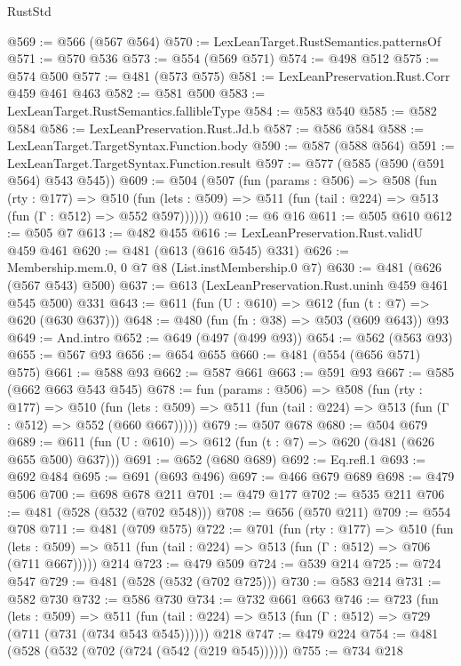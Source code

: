 \begin{lexlean}{RustStd}
\begin{coremodule}
{\begin{coremodule}
{{{{{{{@569 := @566 (@567 @564)
@570 := LexLeanTarget.RustSemantics.patternsOf
@571 := @570 @536
@573 := @554 (@569 @571)
@574 := @498 @512
@575 := @574 @500
@577 := @481 (@573 @575)
@581 := LexLeanPreservation.Rust.Corr @459 @461 @463
@582 := @581 @500
@583 := LexLeanTarget.RustSemantics.fallibleType
@584 := @583 @540
@585 := @582 @584
@586 := LexLeanPreservation.Rust.Jd.b
@587 := @586 @584
@588 := LexLeanTarget.TargetSyntax.Function.body
@590 := @587 (@588 @564)
@591 := LexLeanTarget.TargetSyntax.Function.result
@597 := @577 (@585 (@590 (@591 @564) @543 @545))
@609 := @504
    (@507
      (fun (params : @506) =>
      @508
        (fun (rty : @177) =>
        @510
          (fun (lets : @509) => @511 (fun (tail : @224) => @513 (fun (Γ : @512) => @552 @597))))))
@610 := @6 @16
@611 := @505 @610
@612 := @505 @7
@613 := @482 @455
@616 := LexLeanPreservation.Rust.validU @459 @461
@620 := @481 (@613 (@616 @545) @331)
@626 := Membership.mem.{0, 0} @7 @8 (List.instMembership.{0} @7)
@630 := @481 (@626 (@567 @543) @500)
@637 := @613 (LexLeanPreservation.Rust.uninh @459 @461 @545 @500) @331
@643 := @611 (fun (U : @610) => @612 (fun (t : @7) => @620 (@630 @637)))
@648 := @480 (fun (fn : @38) => @503 (@609 @643)) @93
@649 := And.intro
@652 := @649 (@497 (@499 @93))
@654 := @562 (@563 @93)
@655 := @567 @93
@656 := @654 @655
@660 := @481 (@554 (@656 @571) @575)
@661 := @588 @93
@662 := @587 @661
@663 := @591 @93
@667 := @585 (@662 @663 @543 @545)
@678 := fun (params : @506) =>
  @508
    (fun (rty : @177) =>
    @510
      (fun (lets : @509) => @511 (fun (tail : @224) => @513 (fun (Γ : @512) => @552 (@660 @667)))))
@679 := @507 @678
@680 := @504 @679
@689 := @611 (fun (U : @610) => @612 (fun (t : @7) => @620 (@481 (@626 @655 @500) @637)))
@691 := @652 (@680 @689)
@692 := Eq.refl.{1}
@693 := @692 @484
@695 := @691 (@693 @496)
@697 := @466 @679 @689
@698 := @479 @506
@700 := @698 @678 @211
@701 := @479 @177
@702 := @535 @211
@706 := @481 (@528 (@532 (@702 @548)))
@708 := @656 (@570 @211)
@709 := @554 @708
@711 := @481 (@709 @575)
@722 := @701
    (fun (rty : @177) =>
    @510
      (fun (lets : @509) => @511 (fun (tail : @224) => @513 (fun (Γ : @512) => @706 (@711 @667)))))
    @214
@723 := @479 @509
@724 := @539 @214
@725 := @724 @547
@729 := @481 (@528 (@532 (@702 @725)))
@730 := @583 @214
@731 := @582 @730
@732 := @586 @730
@734 := @732 @661 @663
@746 := @723
    (fun (lets : @509) =>
    @511 (fun (tail : @224) => @513 (fun (Γ : @512) => @729 (@711 (@731 (@734 @543 @545))))))
    @218
@747 := @479 @224
@754 := @481 (@528 (@532 (@702 (@724 (@542 (@219 @545))))))
@755 := @734 @218
}}}}}}}
\end{coremodule}}
\end{coremodule}
\end{lexlean}
